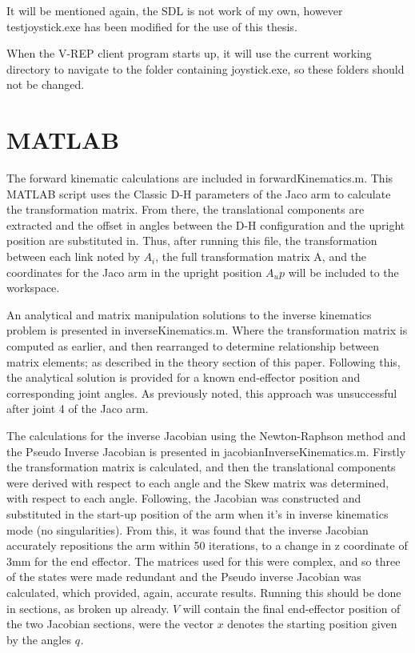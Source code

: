 \documentclass[12pt,openany,a4paper]{book}
\begin{document}
{It will be mentioned again, the SDL is not work of my own, however testjoystick.exe has been modified for the use of this thesis.

When the V-REP client program starts up, it will use the current working directory to navigate to the folder containing joystick.exe, so these folders should not be changed.

\section{MATLAB}
The forward kinematic calculations are included in forwardKinematics.m. This MATLAB script uses the Classic D-H parameters of the Jaco arm to calculate the transformation matrix. From there, the translational components are extracted and the offset in angles between the D-H configuration and the upright position are substituted in. Thus, after running this file, the transformation between each link noted by $A_i$, the full transformation matrix A, and the coordinates for the Jaco arm in the upright position $A_up$ will be included to the workspace.

An analytical and matrix manipulation solutions to the inverse kinematics problem is presented in inverseKinematics.m. Where the transformation matrix is computed as earlier, and then rearranged to determine relationship between matrix elements; as described in the theory section of this paper. Following this, the analytical solution is provided for a known end-effector position and corresponding joint angles. As previously noted, this approach was unsuccessful after joint 4 of the Jaco arm.

The calculations for the inverse Jacobian using the Newton-Raphson method and the Pseudo Inverse Jacobian is presented in jacobianInverseKinematics.m. Firstly the transformation matrix is calculated, and then the translational components were derived with respect to each angle and the Skew matrix was determined, with respect to each angle. Following, the Jacobian was constructed and substituted in the start-up position of the arm when it's in inverse kinematics mode (no singularities). From this, it was found that the inverse Jacobian accurately repositions the arm within 50 iterations, to a change in z coordinate of 3mm for the end effector. The matrices used for this were complex, and so three of the states were made redundant and the Pseudo inverse Jacobian was calculated, which provided, again, accurate results. Running this should be done in sections, as broken up already. $V$ will contain the final end-effector position of the two Jacobian sections, were the vector $x$ denotes the starting position given by the angles $q_{}$.

}
\end{document}
